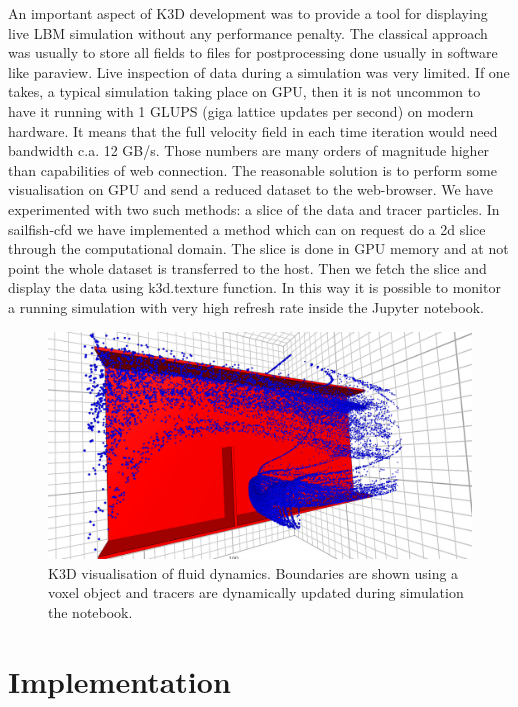 \documentclass{deliverablereport}
\begin{document}
An important aspect of K3D development was to provide a tool for
displaying live LBM simulation without any performance penalty. The
classical approach was usually to store all fields to files for
postprocessing done usually in software like paraview. Live inspection
of data during a simulation was very limited.  If one takes, a typical
simulation taking place on GPU, then it is not uncommon to have it
running with 1 GLUPS (giga lattice updates per second) on modern
hardware. It means that the full velocity field in each time iteration
would need bandwidth c.a. 12 GB/s. Those numbers are many orders of
magnitude higher than capabilities of web connection.  The reasonable
solution is to perform some visualisation on GPU and send a reduced
dataset to the web-browser. We have experimented with two such
methods: a slice of the data and tracer particles. In sailfish-cfd we
have implemented a method which can on request do a 2d slice through
the computational domain. The slice is done in GPU memory and at not
point the whole dataset is transferred to the host. Then we fetch the
slice and display the data using k3d.texture function. In this way it
is possible to monitor a running simulation with very high refresh
rate inside the Jupyter notebook. 


\begin{figure}[ht]
  \includegraphics[width=\textwidth,trim={0 0 0 1px},clip]{k3d_cfd2.png}
  \caption{K3D visualisation of fluid
  dynamics. Boundaries are shown using a voxel object and tracers are
  dynamically updated during simulation the notebook.}
\end{figure}
 



\section{Implementation}
\end{document}
